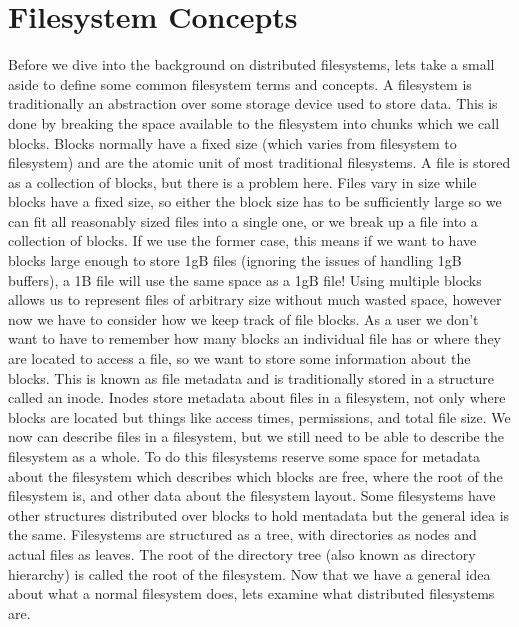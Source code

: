 \label{chapter:rel_work}




\section{Filesystem Concepts}

Before we dive into the background on distributed filesystems, lets take a
small aside to define some common filesystem terms and concepts. A filesystem
is traditionally an abstraction over some storage device used to store data.
This is done by breaking the space available to the filesystem into chunks
which we call blocks. Blocks normally have a fixed size (which varies from
filesystem to filesystem) and are the atomic unit of most traditional
filesystems. A file is stored as a collection of blocks, but there is a
problem here. Files vary in size while blocks have a fixed size, so either the
block size has to be sufficiently large so we can fit all reasonably sized
files into a single one, or we break up a file into a collection of blocks. If
we use the former case, this means if we want to have blocks large enough to
store 1gB files (ignoring the issues of handling 1gB buffers), a 1B file will
use the same space as a 1gB file! Using multiple blocks allows us to represent
files of arbitrary size without much wasted space, however now we have to
consider how we keep track of file blocks. As a user we don’t want to have to
remember how many blocks an individual file has or where they are located to
access a file, so we want to store some information about the blocks. This is
known as file metadata and is traditionally stored in a structure called an
inode. Inodes store metadata about files in a filesystem, not only where
blocks are located but things like access times, permissions, and total file
size. We now can describe files in a filesystem, but we still need to be able
to describe the filesystem as a whole. To do this filesystems reserve some
space for metadata about the filesystem which describes which blocks are free,
where the root of the filesystem is, and other data about the filesystem
layout. Some filesystems have other structures distributed over blocks to hold
mentadata but the general idea is the same. Filesystems are structured as a
tree, with directories as nodes and actual files as leaves. The root of the
directory tree (also known as directory hierarchy) is called the root of the
filesystem. Now that we have a general idea about what a normal filesystem
does, lets examine what distributed filesystems are.


